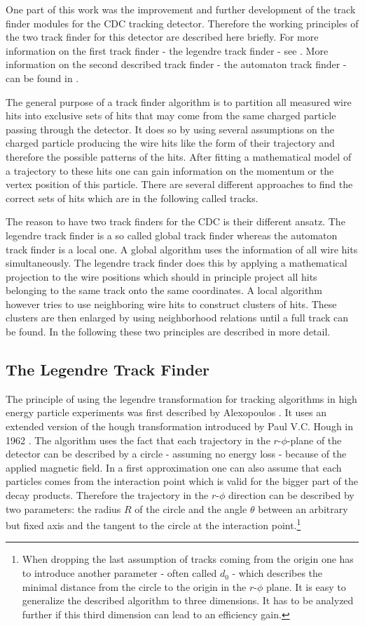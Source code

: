 One part of this work was the improvement and further development of the track finder modules for the CDC tracking detector. Therefore the working principles of the two track finder for this detector are described here briefly. For more information on the first track finder - the legendre track finder - see \cite{kronenbitter}. More information on the second described track finder - the automaton track finder - can be found in \cite{oliver}.

The general purpose of a track finder algorithm is to partition all measured wire hits into exclusive sets of hits that may come from the same charged particle passing through the detector. It does so by using several assumptions on the charged particle producing the wire hits like the form of their trajectory and therefore the possible patterns of the hits. After fitting a mathematical model of a trajectory to these hits one can gain information on the momentum or the vertex position of this particle. There are several different approaches to find the correct sets of hits which are in the following called tracks.

The reason to have two track finders for the CDC is their different ansatz. The legendre track finder is a so called global track finder whereas the automaton track finder is a local one. A global algorithm uses the information of all wire hits simultaneously. The legendre track finder does this by applying a mathematical projection to the wire positions which should in principle project all hits belonging to the same track onto the same coordinates. A local algorithm however tries to use neighboring wire hits to construct clusters of hits. These clusters are then enlarged by using neighborhood relations until a full track can be found. In the following these two principles are described in more detail.

\subsection{The Legendre Track Finder}
The principle of using the legendre transformation for tracking algorithms in high energy particle experiments was first described by Alexopoulos \cite{legendre}. It uses an extended version of the hough transformation introduced by Paul V.C. Hough in 1962 \cite{hough}. The algorithm uses the fact that each trajectory in the $r$-$\phi$-plane of the detector can be described by a circle - assuming no energy loss - because of the applied magnetic field. In a first approximation one can also assume that each particles comes from the interaction point which is valid for the bigger part of the decay products. Therefore the trajectory in the $r$-$\phi$ direction can be described by two parameters: the radius $R$ of the circle and the angle $\theta$ between an arbitrary but fixed axis and the tangent to the circle at the interaction point.\footnote{When dropping the last assumption of tracks coming from the origin one has to introduce another parameter - often called $d_0$ - which describes the minimal distance from the circle to the origin in the $r$-$\phi$ plane. It is easy to generalize the described algorithm to three dimensions. It has to be analyzed further if this third dimension can lead to an efficiency gain.}

